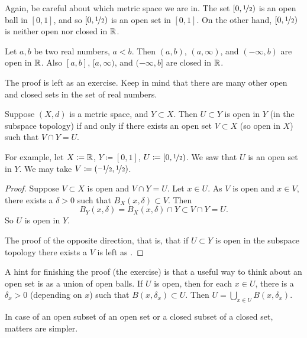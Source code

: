 Again, be careful about which metric space we are in.
The set $[0,\nicefrac{1}{2})$ is
an open ball in $[0,1]$, and so $[0,\nicefrac{1}{2})$ is
an open set in $[0,1]$.  On the other hand, $[0,\nicefrac{1}{2})$
is neither open nor closed in ${\mathbb{R}}$.

\begin{prop} \label{prop:topology:intervals:openclosed}
Let $a, b$ be two real numbers, $a < b$.  Then $(a,b)$, $(a,\infty)$,
and $(-\infty,b)$ are open in ${\mathbb{R}}$.
Also $[a,b]$, $[a,\infty)$,
and $(-\infty,b]$ are closed in ${\mathbb{R}}$.
\end{prop}

The proof is left as an exercise.  Keep in mind that
there are many other open and
closed sets in the set of real numbers. %

\begin{prop} \label{prop:topology:subspaceopen}
Suppose $(X,d)$ is a metric space, and $Y \subset X$.  Then $U \subset Y$
is open in $Y$ (in the subspace topology) if and only if
there exists an open set $V \subset X$ (so open in $X$) such that
$V \cap Y = U$.
\end{prop}

For example, let $X \coloneqq {\mathbb{R}}$, $Y \coloneqq [0,1]$, $U \coloneqq [0,\nicefrac{1}{2})$.
We saw that $U$ is an open set in $Y$.
We may take $V \coloneqq (\nicefrac{-1}{2},\nicefrac{1}{2})$.

\begin{proof}
Suppose $V \subset X$ is open and $V \cap Y = U$.
Let $x \in U$.
As $V$ is open and $x \in V$, there
exists a $\delta > 0$ such that $B_X(x,\delta) \subset V$.
Then
\begin{equation*}
B_Y(x,\delta) = B_X(x,\delta) \cap Y \subset V \cap Y = U .
\end{equation*}
So $U$ is open in $Y$.

The proof of the opposite direction, that is, that if $U \subset Y$
is open in the subspace topology there exists a $V$ is left as
.
\end{proof}

A hint for finishing the proof (the exercise) is that
a useful way to think about an open set is as a union of open balls.  If $U$ is
open, then for each $x \in U$, there is a $\delta_x > 0$ (depending on $x$) such that
$B(x,\delta_x) \subset U$.  Then $U = \bigcup_{x\in U} B(x,\delta_x)$.

In case of an open subset of an open set or a closed subset of a closed
set, matters are simpler.

